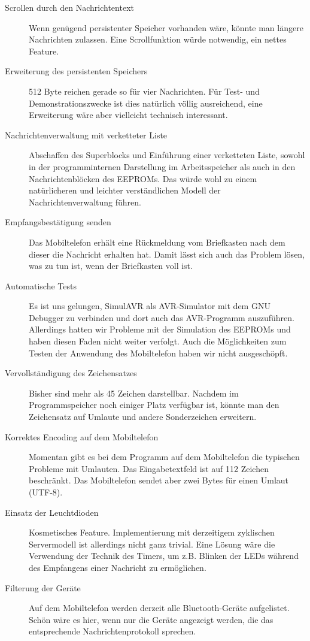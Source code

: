 \documentclass[ngerman]{article}
\begin{document}
\begin{description}
    \item[Scrollen durch den Nachrichtentext] Wenn genügend persistenter Speicher vorhanden wäre, könnte man 
        längere Nachrichten zulassen. Eine Scrollfunktion würde notwendig, ein nettes
        Feature.
    \item[Erweiterung des persistenten Speichers] 512 Byte reichen gerade so für vier Nachrichten. Für Test-
        und Demonstrationszwecke ist dies natürlich völlig ausreichend, eine Erweiterung wäre aber vielleicht
        technisch interessant.
    \item[Nachrichtenverwaltung mit verketteter Liste] Abschaffen des Superblocks und Einführung einer verketteten
        Liste, sowohl in der programminternen Darstellung im Arbeitsspeicher als auch in den Nachrichtenblöcken
        des EEPROMs. Das würde wohl zu einem natürlicheren und leichter ver\-ständ\-lichen Modell der 
        Nachrichtenverwaltung führen.
    \item[Empfangsbestätigung senden] Das Mobiltelefon erhält eine Rückmeldung vom Briefkasten nach dem
        dieser die Nachricht erhalten hat. Damit lässt sich auch das Problem lösen, was zu tun ist, 
        wenn der Briefkasten voll ist.
    \item[Automatische Tests] Es ist uns gelungen, SimulAVR als AVR-Simulator mit dem GNU Debugger
        zu verbinden und dort auch das AVR-Programm auszuführen. Allerdings hatten wir Probleme mit
        der Simulation des EEPROMs und haben diesen Faden nicht weiter verfolgt. Auch die Möglichkeiten
        zum Testen der Anwendung des Mobiltelefon haben wir nicht ausgeschöpft.
    \item[Vervollständigung des Zeichensatzes] Bisher sind mehr als 45 Zeichen darstellbar. Nachdem im
        Programmspeicher noch einiger Platz verfügbar ist, könnte man den Zeichensatz auf Umlaute
        und andere Sonderzeichen erweitern.
    \item[Korrektes Encoding auf dem Mobiltelefon] Momentan gibt es bei dem Programm auf dem Mobiltelefon
        die typischen Probleme mit Umlauten. Das Eingabetextfeld ist auf 112 Zeichen beschränkt. Das
        Mobiltelefon sendet aber zwei Bytes für einen Umlaut (UTF-8).
    \item[Einsatz der Leuchtdioden] Kosmetisches Feature. Implementierung mit derzeitigem zyklischen Servermodell
        ist allerdings nicht ganz trivial. Eine Lösung wäre die Verwendung der Technik des Timers, um z.B.
        Blinken der LEDs während des Empfangens einer Nachricht zu ermöglichen.
    \item[Filterung der Geräte] Auf dem Mobiltelefon werden derzeit alle Bluetooth-Geräte aufgelistet. Schön
        wäre es hier, wenn nur die Geräte angezeigt werden, die das entsprechende Nachrichtenprotokoll
	sprechen.
\end{description}
\end{document}
